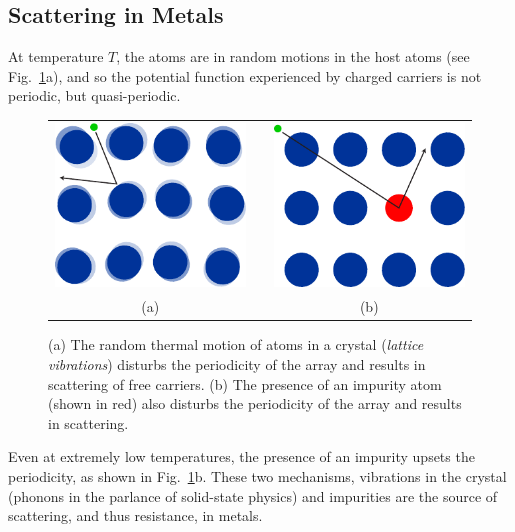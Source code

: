 \subsection{Scattering in Metals}
At temperature $T$, the atoms are in random motions in the host atoms (see Fig.~\ref{fig:slide16}a), and so the potential function experienced by charged carriers is not periodic, but quasi-periodic. 
\begin{figure}
\centering
\begin{tabular}{ccc}
\includegraphics[width=.3\columnwidth]{lattice_vibrate} &
\hspace{.15\columnwidth} &
\includegraphics[width=.3\columnwidth]{lattice_impurity}\\
(a) & & (b)\\
\end{tabular}
\caption{(a) The random thermal motion of atoms in a crystal (\emph{lattice vibrations}) disturbs the periodicity of the array and results in scattering of free carriers.  (b) The presence of an impurity atom (shown in red) also disturbs the periodicity of the array and results in scattering.}
\label{fig:slide16}
\end{figure}
Even at extremely low temperatures, the presence of an impurity upsets the periodicity, as shown in Fig.~\ref{fig:slide16}b.  These two mechanisms, vibrations in the crystal (phonons in the parlance of solid-state physics) and impurities are the source of scattering, and thus resistance, in metals.
